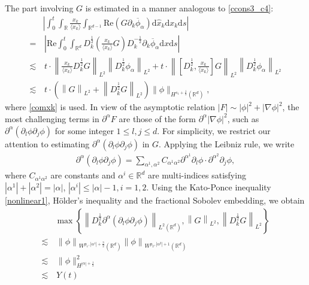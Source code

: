 \documentclass[10pt,twoside,a4paper]{article}
\numberwithin{equation}{section}\allowdisplaybreaks
\def\leq{\leqslant}
\begin{document}
The part involving $ G $ is estimated in a manner analogous to \eqref{ccons3_c4}:
\begin{align*} 
		&\left|\int_0^t	\int_{\mathbb{R}}\frac{x_k}{\langle x_k\rangle}  \int_{\mathbb{R}^{d-1}}  \mathrm{Re} \left(G \partial_k \overline{\phi}_\alpha\right)   \mathrm{d} \hat{x}_k  \mathrm{d} x_k \mathrm{d} s\right|\nonumber\\
		=&\, \left|\mathrm{Re} \int_0^t	\int_{\mathbb{R}^d}  D_k^{\frac 12} \left(\frac{x_k}{\langle x_k\rangle} G\right)   D_k^{-\frac 12}\partial_k \overline{\phi}_\alpha      \mathrm{d} x \mathrm{d} s\right|\\
		\lesssim &\,t\cdot \left\|  \frac{x_k}{\langle x_k\rangle}   D_k^{\frac 12}   G \right\|_{L^2} \left\|   D_k^{\frac 12}\phi_{\alpha} \right\|_{L^2}  + t\cdot \left\|  \left[D_k^{\frac 12},\frac{x_k}{\langle x_k\rangle}   \right]   G \right\|_{L^2} \left\|     D_k^{\frac 12}\phi_{\alpha} \right\|_{L^2}\nonumber\\
		\lesssim &\, t\cdot\left( \left\|    G \right\|_{L^2}+\left\|    D_k^{\frac 12}   G \right\|_{L^2}\right)\|\phi\|_{H^{s_1+\frac 12}(\mathbb{R}^{d})},\nonumber
\end{align*}
where 
  \eqref{comxk} is used.  In view of the asymptotic relation $ |F| \sim |\phi|^2+|\nabla \phi|^2 $,     the most challenging terms in  $ \partial^\alpha F $ are those of the form  $ \partial^\alpha |\nabla \phi|^2 $, such as $ \partial^\alpha(\partial_{l} \phi\partial_{j} \phi) $ for some  integer $1\leq  l,j \leq d  $. For simplicity, we restrict our attention to estimating  $ \partial^\alpha(\partial_{l} \phi\partial_{j} \phi ) $ in $ G $.  Applying the Leibniz rule, we write
\begin{align*} 
	\partial^\alpha(\partial_{l} \phi\partial_{j} \phi )=\sum_{\alpha^1,\alpha^2} C_{\alpha^1\alpha^2}  \partial^{\alpha^1}  \partial_{l}\phi \cdot   \partial^{\alpha^2}\partial_{j} \phi,  
\end{align*}
where $ C_{\alpha^1\alpha^2}  $ are constants and  $ \alpha^i \in \mathbb{R}^{d} $  are multi-indices satisfying $ |\alpha^1|+|\alpha^2|=|\alpha| $, $ |\alpha^i|\leq |\alpha|-1,i=1,2 $.  
Using the Kato-Ponce inequality \eqref{nonlinear1}, Hölder's inequality and the fractional Sobolev embedding, we obtain
\begin{align} \label{qG}
&\max \left\{	\left\| D_k^{\frac 12} 	\partial^\alpha(\partial_{l} \phi\partial_{j} \phi ) \right\|_{L^2(\mathbb{R}^d)},\left\|     G \right\|_{L^2}, \left\|  D_k^{\frac 12}   G \right\|_{L^2} \right \}\\
	\lesssim &\,\left\|  \phi\right\|_{W^{p_1,|\alpha^1|+\frac32}(\mathbb{R}^d)} \left\|  \phi\right\|_{W^{p_2,|\alpha^2|+1}(\mathbb{R}^d)} \nonumber\\
	\lesssim &\,\|\phi\|_{H^{|\alpha|+\frac12}}^2\nonumber\\
	\lesssim &\, Y(t) \nonumber
\end{align}
\end{document}
